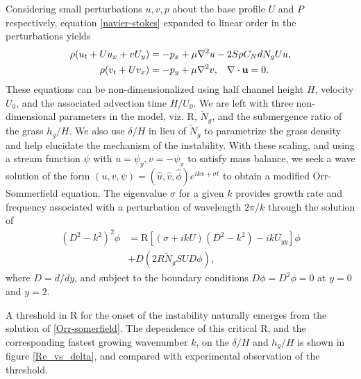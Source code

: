 \documentclass[aps,prl,reprint,twocolumn,showpacs,superscriptaddress,10pt]{revtex4-1}  %
\newcommand{\bu}{\mathbf{u}}
\newcommand{\hg}{h_g}
\newcommand{\Rey}{\text{R}}
\newcommand{\Ndg}{\tilde{N}_g}
\begin{document}
Considering small perturbations $u, v, p$ about the base profile $U$ and $P$ respectively, equation \eqref{navier-stokes} expanded to linear order in the perturbations yields
\begin{equation}
\begin{split}
\rho(u_t+U u_x+vU_y) &= -p_x+ {\mu}\nabla^2u-2S\rho C_{N}dN_{g}Uu, \\
\rho(v_t+ Uv_x) &= -p_y+ {\mu}\nabla^2v, \hspace{0.3cm} \nabla\cdot\bu=0.
\end{split}
\end{equation}
These equations can be non-dimensionalized using half channel height $H$, velocity $U_0$, and the associated advection time $H/U_0$. 
We are left with three non-dimensional parameters in the model, viz. $\Rey$, $\Ndg$, and the submergence ratio of the grass $h_g/H$. 
We also use $\delta/H$ in lieu of $\Ndg$ to parametrize the grass density and help elucidate the mechanism of the instability. 
With these scaling, and using a stream function $\psi$ with $u = \psi_{y}, v= -\psi_x$ to satisfy mass balance, we seek a wave solution of the form $\left(u,v,\psi \right)= \left(\hat u, \hat v, \hat\phi \right)e^{ikx+\sigma t}$ to  obtain a modified Orr-Sommerfield equation. 
The eigenvalue $\sigma$ for a given $k$ provides growth rate and frequency associated with a perturbation of wavelength $2\pi/k$ through the solution of
\begin{equation}
\begin{split}
\left(D^2 -k^{2} \right)^2\phi &= \Rey \left[ \left({\sigma}+ikU\right) \left(D^2-k^2\right) -ikU_{yy}\right]\phi \\
&+D\left(2R \Ndg S U D \phi\right),
\label{Orr-somerfield}
\end{split}
\end{equation}
where $D=d/dy$, and subject to the boundary conditions $D\phi = D^2\phi = 0$ at $y=0$ and $y=2$. 

A threshold in $\Rey$ for the onset of the instability naturally emerges from the solution of \eqref{Orr-somerfield}. 
The dependence of this critical $\Rey$, and the corresponding fastest growing wavenumber $k$, on the $\delta/H$ and $\hg/H$ is shown in figure \ref{Re_vs_delta}, and compared with experimental observation of the threshold\cite{Ghisal02}. 
\end{document}
